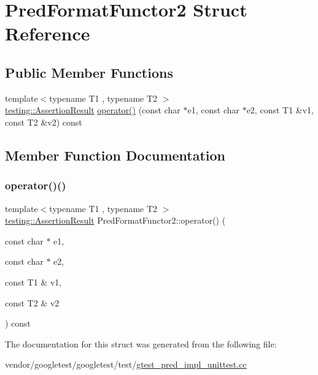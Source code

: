 \hypertarget{struct_pred_format_functor2}{}\section{Pred\+Format\+Functor2 Struct Reference}
\label{struct_pred_format_functor2}
\subsection*{Public Member Functions}
\begin{DoxyCompactItemize}
\item 
{\footnotesize template$<$typename T1 , typename T2 $>$ }\\\hyperlink{classtesting_1_1_assertion_result}{testing\+::\+Assertion\+Result} \hyperlink{struct_pred_format_functor2_a0169e0105e15d5c63bece2a20646b22b}{operator()} (const char $\ast$e1, const char $\ast$e2, const T1 \&v1, const T2 \&v2) const
\end{DoxyCompactItemize}


\subsection{Member Function Documentation}
\mbox{\label{struct_pred_format_functor2_a0169e0105e15d5c63bece2a20646b22b}} 
\subsubsection{\texorpdfstring{operator()()}{operator()()}}
{\footnotesize\ttfamily template$<$typename T1 , typename T2 $>$ \\
\hyperlink{classtesting_1_1_assertion_result}{testing\+::\+Assertion\+Result} Pred\+Format\+Functor2\+::operator() (\begin{DoxyParamCaption}\item[{const char $\ast$}]{e1,  }\item[{const char $\ast$}]{e2,  }\item[{const T1 \&}]{v1,  }\item[{const T2 \&}]{v2 }\end{DoxyParamCaption}) const\hspace{0.3cm}{\ttfamily [inline]}}



The documentation for this struct was generated from the following file\+:\begin{DoxyCompactItemize}
\item 
vendor/googletest/googletest/test/\hyperlink{gtest__pred__impl__unittest_8cc}{gtest\+\_\+pred\+\_\+impl\+\_\+unittest.\+cc}\end{DoxyCompactItemize}
